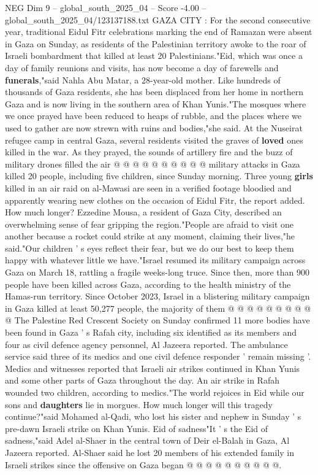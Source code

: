 \begin{textsample}{NEG Dim 9 – global\_south\_2025\_04 – Score -4.00 – global\_south\_2025\_04/123137188.txt}  \label{ex:f9_neg_298}
GAZA CITY : For the second consecutive year, traditional Eidul Fitr celebrations marking the end of Ramazan were absent in Gaza on Sunday, as residents of the Palestinian territory awoke to the roar of Israeli bombardment that killed at least 20 Palestinians."Eid, which was once a day of family reunions and visits, has now become a day of farewells and \textbf{funerals},"said Nahla Abu Matar, a 28-year-old mother.
Like hundreds of thousands of Gaza residents, she has been displaced from her home in northern Gaza and is now living in the southern area of Khan Yunis."The mosques where we once prayed have been reduced to heaps of rubble, and the places where we used to gather are now strewn with ruins and bodies,"she said.
At the Nuseirat refugee camp in central Gaza, several residents visited the graves of \textbf{loved} ones killed in the war.
As they prayed, the sounds of artillery fire and the buzz of military drones filled the air @ @ @ @ @ @ @ @ @ @ military attacks in Gaza killed 20 people, including five children, since Sunday morning.
Three young \textbf{girls} killed in an air raid on al-Mawasi are seen in a verified footage bloodied and apparently wearing new clothes on the occasion of Eidul Fitr, the report added.
How much longer?
Ezzedine Mousa, a resident of Gaza City, described an overwhelming sense of fear gripping the region."People are afraid to visit one another because a rocket could strike at any moment, claiming their lives,"he said."Our children ' s eyes reflect their fear, but we do our best to keep them happy with whatever little we have."Israel resumed its military campaign across Gaza on March 18, rattling a fragile weeks-long truce.
Since then, more than 900 people have been killed across Gaza, according to the health ministry of the Hamas-run territory.
Since October 2023, Israel in a blistering military campaign in Gaza killed at least 50,277 people, the majority of them @ @ @ @ @ @ @ @ @ @ The Palestine Red Crescent Society on Sunday confirmed 11 more bodies have been found in Gaza ' s Rafah city, including six identified as its members and four as civil defence agency personnel, Al Jazeera reported.
The ambulance service said three of its medics and one civil defence responder ' remain missing '.
Medics and witnesses reported that Israeli air strikes continued in Khan Yunis and some other parts of Gaza throughout the day.
An air strike in Rafah wounded two children, according to medics."The world rejoices in Eid while our sons and \textbf{daughters} lie in morgues.
How much longer will this tragedy continue?"said Mohamed al-Qadi, who lost his sister and nephew in Sunday ' s pre-dawn Israeli strike on Khan Yunis.
Eid of sadness"It ' s the Eid of sadness,"said Adel al-Shaer in the central town of Deir el-Balah in Gaza, Al Jazeera reported.
Al-Shaer said he lost 20 members of his extended family in Israeli strikes since the offensive on Gaza began @ @ @ @ @ @ @ @ @ @.

\end{textsample}
